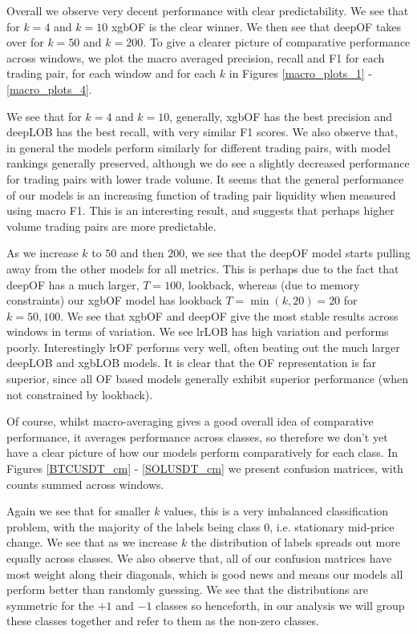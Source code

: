 Overall we observe very decent performance with clear predictability. We see that for $k=4$ and $k=10$ 
xgbOF is the clear winner. We then see that deepOF takes over for $k=50$ and  $k=200$.
To give a clearer picture of comparative performance across windows, we plot the macro averaged
precision, recall and F1 for each trading pair, for each window and for each $k$ in Figures \ref{macro_plots_1} - \ref{macro_plots_4}.


We see that for $k=4$ and $k=10$, generally, xgbOF has the best precision and deepLOB has the best recall, with very similar
F1 scores. We also observe that, in general the models perform similarly for different trading pairs, with model rankings generally preserved,
although we do see a slightly decreased performance for trading pairs with lower trade volume. It seems that the general performance of our models
is an increasing function of trading pair liquidity when measured using macro F1.
This is an interesting result, and suggests that perhaps higher volume trading pairs are more predictable.

As we increase $k$ to $50$ and then $200$, we see that the deepOF model starts pulling away from the other models for all metrics.
This is perhaps due to the fact that deepOF has a much larger, $T=100$, lookback, whereas (due to memory constraints) our xgbOF model
has lookback $T = \min(k, 20) = 20$ for $k= 50, 100$.
We see that xgbOF and deepOF give the most stable results across windows in terms of variation. We see lrLOB has high variation
and performs poorly. Interestingly lrOF performs very well, often beating out the much larger deepLOB and xgbLOB models.
It is clear that the OF representation is far superior, since all OF based models generally exhibit superior performance
(when not constrained by lookback).

Of course, whilst macro-averaging gives a good overall idea of comparative performance, it averages performance across classes,
so therefore we don't yet have a clear picture of how our models perform comparatively for each class.
In Figures \ref{BTCUSDT_cm} - \ref{SOLUSDT_cm} we present confusion matrices, with counts summed across windows.

Again we see that for smaller $k$ values, this is a very imbalanced classification problem, with the majority
of the labels being class $0$, i.e. stationary mid-price change. We see that as we increase $k$ the distribution
of labels spreads out more equally across classes. We also observe that, all of our confusion matrices have most weight
along their diagonals, which is good news and means our models all perform better than randomly guessing.
We see that the distributions are symmetric for the $+1$ and $-1$ classes so henceforth, in our analysis
we will group these classes together and refer to them as the non-zero classes.

